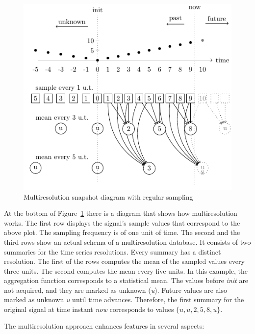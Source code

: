\begin{figure}
  \centering
  \includegraphics{fig_mtsms_sequence.pdf}
  \caption{Multiresolution snapshot diagram with regular sampling}
  \label{fig:mtsms:sequence}
\end{figure}

At the bottom of Figure~\ref{fig:mtsms:sequence} there is a diagram
that shows how multiresolution works. The first row displays the
signal's sample values that correspond to the above plot. The sampling
frequency is of one unit of time. The second and the third rows show an
actual schema of a multiresolution database. It consists of two
summaries for the time series resolutions. Every summary has a
distinct resolution. The first of the rows computes the mean of the
sampled values every three units. The second computes the mean every
five units. In this example, the aggregation function corresponds to a
statistical mean. The values before \emph{init} are not acquired, and
they are marked as unknown (\emph{u}). Future values are also marked
as unknown \emph{u} until time advances. Therefore, the first summary
for the original signal at time instant \emph{now} corresponds to
values $\{u,u,2,5,8,u\}$.

The multiresolution approach enhances  features in several
aspects:

